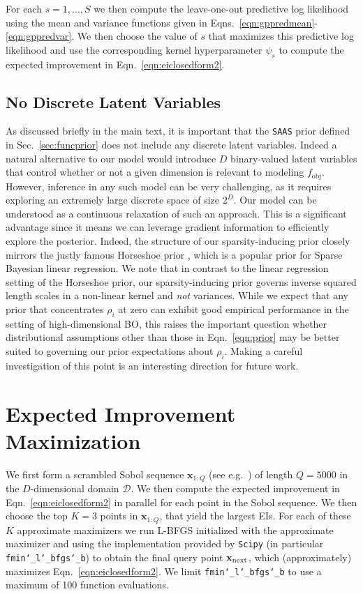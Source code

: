 \documentclass[accepted]{uai2021} %
\newcommand{\fobj}{f_{\text{obj}}}
\newcommand{\priorname}{{\texttt {SAAS}}}
\newcommand{\bx}{\mathbf{x}}
\newcommand{\DD}{\mathcal{D}}
\begin{document}
For each $s=1,...,S$ we then compute the leave-one-out predictive log likelihood
using the mean and variance functions given in
Eqns.~\eqref{eqn:gppredmean}-\eqref{eqn:gppredvar}. We then choose the value
of $s$ that maximizes this predictive log likelihood and use the corresponding
kernel hyperparameter $\psi_s$ to compute the expected improvement
in Eqn.~\eqref{eqn:eiclosedform2}.

\subsection{No Discrete Latent Variables}
\label{sec:nodisc}
As discussed briefly in the main text, it is important
that the \priorname{} prior defined in Sec.~\ref{sec:funcprior} does not include any discrete latent variables.
Indeed a natural alternative to our model would introduce $D$ binary-valued
latent variables that control whether or not a given dimension is relevant to modeling $\fobj$.
However, inference in any such model can be very challenging, as it requires exploring an extremely large discrete space of size $2^D$.
Our model can be understood as a continuous relaxation of such an approach.
This is a significant advantage since it means we can leverage gradient information to efficiently explore the posterior.
Indeed, the structure of our sparsity-inducing prior closely mirrors the justly famous
Horseshoe prior \citep{carvalho2009handling}, which is a popular prior for Sparse Bayesian linear regression.
We note that in contrast to the linear regression setting of the Horseshoe prior,
our sparsity-inducing prior governs inverse squared length scales in a non-linear kernel and \emph{not} variances.
While we expect that any prior that concentrates $\rho_i$ at zero can exhibit good empirical performance in the setting
of high-dimensional BO, this raises the important question whether distributional assumptions other than those in Eqn.~\eqref{eqn:prior} may be better suited to governing our prior expectations about $\rho_i$.
Making a careful investigation of this point is an interesting direction for future work.



\section{Expected Improvement Maximization}
We first form a scrambled Sobol sequence $\bx_{1:Q}$ (see e.g.~\citep{owen2003quasi})
of length  $Q=5000$  in the $D$-dimensional domain $\DD$.
We then compute the expected improvement in Eqn.~\eqref{eqn:eiclosedform2}
in parallel for each point in the Sobol sequence. We then choose the top $K=3$
points in $\bx_{1:Q}$, that yield the largest EIs. For each of these $K$ approximate
maximizers
we run L-BFGS \citep{zhu1997algorithm} initialized with the approximate maximizer and
using the implementation provided by \texttt{Scipy}
(in particular \texttt{fmin\char`_l\char`_bfgs\char`_b})
to obtain the final query point $\bx_{\rm next}$, which (approximately) maximizes
Eqn.~\eqref{eqn:eiclosedform2}. We limit \texttt{fmin\char`_l\char`_bfgs\char`_b} to use a maximum
of 100 function evaluations.
\end{document}
